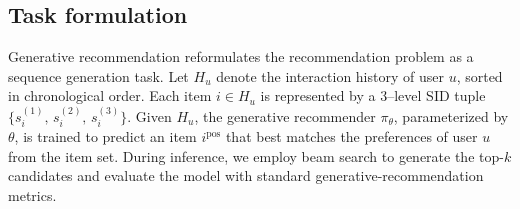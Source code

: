 \subsection{Task formulation}
Generative recommendation reformulates the recommendation problem as a sequence generation task.
Let $H_u$ denote the interaction history of user $u$, sorted in chronological order.  
Each item $i \in H_u$ is represented by a $3$–level SID tuple $\{s^{(1)}_{i},\,s^{(2)}_{i},\,s^{(3)}_{i}\}$.  
Given $H_u$, the generative recommender $\pi_{\theta}$, parameterized by $\theta$, is trained to predict an item $i^{\text{pos}}$ that best matches the preferences of user $u$ from the item set.  
During inference, we employ beam search to generate the top-$k$ candidates and evaluate the model with standard generative-recommendation metrics.